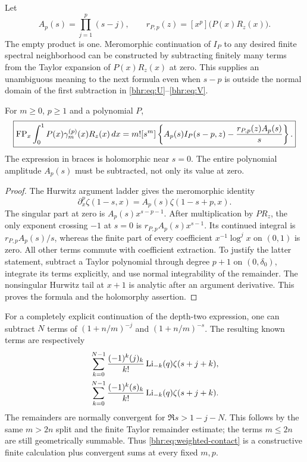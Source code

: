 Let
\begin{equation}\label{bhr:eq:Ap}
 A_p(s)=\prod_{j=1}^p(s-j),\qquad
 r_{P,p}(z)=[x^p]\bigl(P(x)R_z(x)\bigr).
\end{equation}
The empty product is one. Meromorphic continuation of $I_P$ to
any desired finite spectral neighborhood can be constructed by
subtracting finitely many terms from the Taylor expansion of
$P(x)R_z(x)$ at zero. This supplies an unambiguous meaning to
the next formula even when $s-p$ is outside the normal domain
of the first subtraction in \eqref{bhr:eq:U}--\eqref{bhr:eq:V}.

\begin{theorem}\label{bhr:thm:weighted-contact}
For $m\ge0$, $p\ge1$ and a polynomial $P$,
\begin{equation}\label{bhr:eq:weighted-contact}
 \boxed{\displaystyle
 \operatorname{FP}_x\int_0^1P(x)\gamma_m^{(p)}(x)R_z(x)\,dx
   =m![s^m]\left\{
       A_p(s)I_P(s-p,z)-\frac{r_{P,p}(z)A_p(s)}s\right\}.}
\end{equation}
The expression in braces is holomorphic near $s=0$.
The entire polynomial amplitude $A_p(s)$ must be subtracted,
not only its value at zero.
\end{theorem}
\begin{proof}
The Hurwitz argument ladder gives the meromorphic identity
\[
 \partial_x^p\zeta(1-s,x)=A_p(s)\zeta(1-s+p,x).
\]
The singular part at zero is $A_p(s)x^{s-p-1}$.
After multiplication by $P R_z$, the only exponent crossing
$-1$ at $s=0$ is $r_{P,p}A_p(s)x^{s-1}$.
Its continued integral is $r_{P,p}A_p(s)/s$, whereas the
finite part of every coefficient $x^{-1}\log^j x$ on $(0,1)$
is zero. All other terms commute with coefficient extraction.
To justify the latter statement, subtract a Taylor polynomial
through degree $p+1$ on $(0,\delta_0)$, integrate its terms
explicitly, and use normal integrability of the remainder.
The nonsingular Hurwitz tail at $x+1$ is analytic after an
argument derivative. This proves the formula and the
holomorphy assertion.
\end{proof}

For a completely explicit continuation of the depth-two expression,
one can subtract $N$ terms of $(1+n/m)^{-j}$ and $(1+n/m)^{-s}$.
The resulting known terms are respectively
\begin{align}
 &\sum_{k=0}^{N-1}\frac{(-1)^k(j)_k}{k!}
         \operatorname{Li}_{-k}(q)\zeta(s+j+k),\\
 &\sum_{k=0}^{N-1}\frac{(-1)^k(s)_k}{k!}
         \operatorname{Li}_{-k}(q)\zeta(s+j+k).
\end{align}
The remainders are normally convergent for $\Re s>1-j-N$.
This follows by the same $m>2n$ split and the finite Taylor
remainder estimate; the terms $m\le2n$ are still geometrically
summable. Thus \eqref{bhr:eq:weighted-contact} is a constructive
finite calculation plus convergent sums at every fixed $m,p$.


